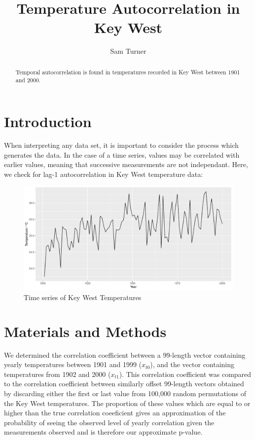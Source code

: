 \documentclass[12pt]{article}
\title{Temperature Autocorrelation in Key West}
\author{Sam Turner}
\date{}
\begin{document}
    \maketitle
    \begin{abstract}
    Temporal autocorrelation is found in temperatures recorded in Key West between 1901 and 2000.

    \end{abstract}


    \section{Introduction}
        When interpreting any data set, it is important to consider the process which generates the data. In the case of a time series, values may be correlated with earlier values, meaning that successive measurements are not independant. Here, we check for lag-1 autocorrelation in Key West temperature data:

        \begin{figure}[H]
        \includegraphics[width=\linewidth]{../Results/TempTimeSeries.pdf}
        \caption{Time series of Key West Temperatures}
        \label{fig:temptimeseries}
        \end{figure}
        

    \section{Materials and Methods}


        We determined the correlation coefficient between a 99-length vector containing yearly temperatures between 1901 and 1999 ($x_{t0}$), and the vector containing temperatures from 1902 and 2000 ($x_{t1}$). This correlation coefficient was compared to the correlation coefficient between similarly offset 99-length vectors obtained by discarding either the  first or last value from 100,000 random permutations of the Key West temperatures. The proportion of these values which are equal to or higher than the true correlation coeeficient gives an approximation of the probability of seeing the observed level of yearly correlation given the measurements observed and is therefore our approximate p-value. 
\end{document}
